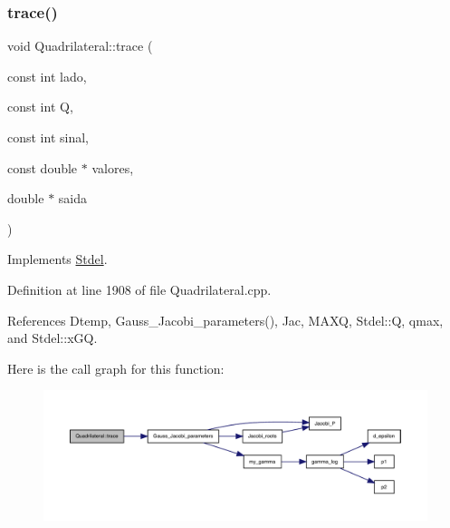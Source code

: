 \subsubsection{\texorpdfstring{trace()}{trace()}}
{\footnotesize\ttfamily void Quadrilateral\+::trace (\begin{DoxyParamCaption}\item[{const int}]{lado,  }\item[{const int}]{Q,  }\item[{const int}]{sinal,  }\item[{const double $\ast$}]{valores,  }\item[{double $\ast$}]{saida }\end{DoxyParamCaption})\hspace{0.3cm}{\ttfamily [virtual]}}



Implements \hyperlink{classStdel_aeb2fe03bbd8af61e503e29d3dd5ae4f0}{Stdel}.



Definition at line 1908 of file Quadrilateral.\+cpp.



References Dtemp, Gauss\+\_\+\+Jacobi\+\_\+parameters(), Jac, M\+A\+XQ, Stdel\+::Q, qmax, and Stdel\+::x\+GQ.

Here is the call graph for this function\+:
\nopagebreak
\begin{figure}[H]
\begin{center}
\leavevmode
\includegraphics[width=350pt]{classQuadrilateral_aaa950602df5656278e6a36863666c0c4_cgraph}
\end{center}
\end{figure}
\mbox{\label{classQuadrilateral_a8ef93eed8fa22ae11f3736fe3b255038}} 

